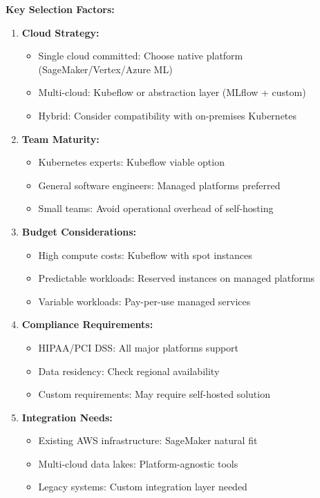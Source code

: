 \textbf{Key Selection Factors:}

\begin{enumerate}
    \item \textbf{Cloud Strategy:}
    \begin{itemize}
        \item Single cloud committed: Choose native platform (SageMaker/Vertex/Azure ML)
        \item Multi-cloud: Kubeflow or abstraction layer (MLflow + custom)
        \item Hybrid: Consider compatibility with on-premises Kubernetes
    \end{itemize}

    \item \textbf{Team Maturity:}
    \begin{itemize}
        \item Kubernetes experts: Kubeflow viable option
        \item General software engineers: Managed platforms preferred
        \item Small teams: Avoid operational overhead of self-hosting
    \end{itemize}

    \item \textbf{Budget Considerations:}
    \begin{itemize}
        \item High compute costs: Kubeflow with spot instances
        \item Predictable workloads: Reserved instances on managed platforms
        \item Variable workloads: Pay-per-use managed services
    \end{itemize}

    \item \textbf{Compliance Requirements:}
    \begin{itemize}
        \item HIPAA/PCI DSS: All major platforms support
        \item Data residency: Check regional availability
        \item Custom requirements: May require self-hosted solution
    \end{itemize}

    \item \textbf{Integration Needs:}
    \begin{itemize}
        \item Existing AWS infrastructure: SageMaker natural fit
        \item Multi-cloud data lakes: Platform-agnostic tools
        \item Legacy systems: Custom integration layer needed
    \end{itemize}
\end{enumerate}

